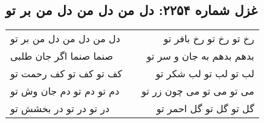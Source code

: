 \begin{center}
\section*{غزل شماره ۲۲۵۴: دل من دل من دل من بر تو}
\label{sec:2254}
\begin{longtable}{l p{0.5cm} r}
دل من دل من دل من بر تو
&&
رخ تو رخ تو رخ بافر تو
\\
صنما صنما اگر جان طلبی
&&
بدهم بدهم به جان و سر تو
\\
کف تو کف تو کف رحمت تو
&&
لب تو لب تو لب شکر تو
\\
دم تو دم تو دم جان وش تو
&&
می تو می تو می چون زر تو
\\
در تو در تو در بخشش تو
&&
گل تو گل تو گل احمر تو
\\
\end{longtable}
\end{center}
